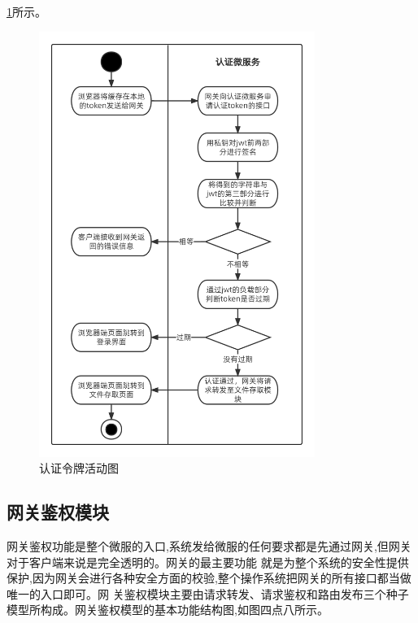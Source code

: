 \ref{fig:认证令牌活动图}所示。

\begin{figure}[htb]
    \centering
    \includegraphics[width=0.8\textwidth]{my_figures/chapter4/认证令牌活动图.png}
    \caption{认证令牌活动图}
    \label{fig:认证令牌活动图}
\end{figure}

\subsection{网关鉴权模块}


网关鉴权功能是整个微服的入口,系统发给微服的任何要求都是先通过网关,但网关对于客户端来说是完全透明的。网关的最主要功能
就是为整个系统的安全性提供保护,因为网关会进行各种安全方面的校验,整个操作系统把网关的所有接口都当做唯一的入口即可。网
关鉴权模块主要由请求转发、请求鉴权和路由发布三个种子模型所构成。网关鉴权模型的基本功能结构图,如图四点八所示。

